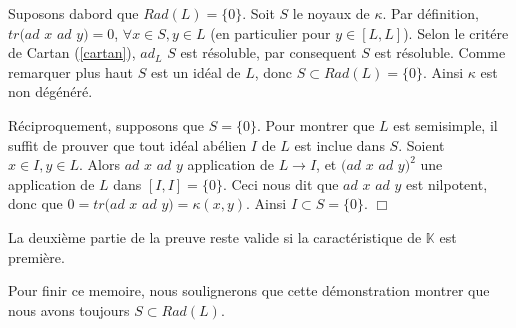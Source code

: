\documentclass[a4paper,openany,12pt]{report}
\newcommand{\KK}{\mathbb{K}}
\theoremstyle{break}
{\theorembodyfont{\upshape}
\newtheorem*{rmq}{Remarque :}
\newtheorem*{prv}{Preuve :}
\newtheorem*{ex}{Exemples :}
\newtheorem*{exe}{Exemple : }
\newtheorem*{nota}{Notation :}
\newtheorem*{dem}{D\'emonstration :}}
\begin{document}
\begin{dem}
\quad Suposons dabord que $Rad(L) = \{0\}$. Soit $S$ le noyaux de $\kappa$. Par définition, $tr(ad$ $x$ $ad$ $y)=0$, $\forall x \in S,y \in L$ (en particulier pour $y \in [L,L]$). Selon le critére de Cartan (\ref{cartan}), $ad_L$ $S$ est résoluble, par consequent $S$ est résoluble. Comme remarquer plus haut $S$ est un idéal de $L$, donc $S \subset Rad(L) = \{0\}$. Ainsi $\kappa$ est non dégénéré. 

\quad Réciproquement, supposons que $S = \{0 \}$. Pour montrer que $L$ est semisimple, il suffit de prouver que tout idéal abélien $I$ de $L$ est inclue dans $S$. Soient $x \in I,y \in L$. Alors $ad$ $x$ $ad$ $y$ application de $L \to I$, et $(ad$ $x$ $ad$ $y)^2$ une application de $L$ dans $[I,I] =\{0\}$. Ceci nous dit que $ad$ $x$ $ad$ $y$ est nilpotent, donc que $0 = tr(ad$ $x$ $ad$ $y)= \kappa(x,y)$. Ainsi $I \subset S = \{0\}$. $\Box$
\end{dem}

\begin{rmq}
\quad La deuxième partie de la preuve reste valide  si la caractéristique de $\KK$ est première.
\end{rmq}

Pour finir ce memoire, nous soulignerons que cette démonstration montrer que nous avons toujours $S \subset Rad(L)$. 
\end{document}
